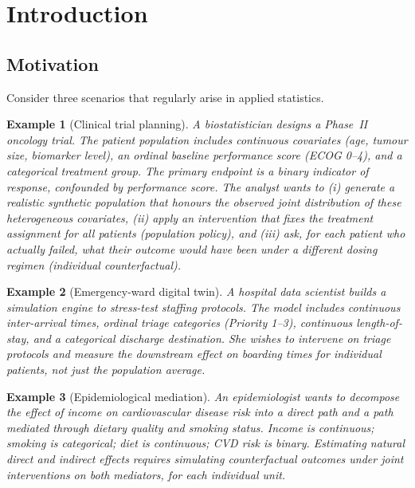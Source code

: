 \documentclass[12pt,a4paper]{article}
\newtheorem{example}{Example}[section]
\begin{document}
\tableofcontents
\newpage

\section{Introduction}
\label{sec:intro}

\subsection{Motivation}

Consider three scenarios that regularly arise in applied statistics.

\begin{example}[Clinical trial planning]
A biostatistician designs a Phase~II oncology trial. The patient population includes
continuous covariates (age, tumour size, biomarker level), an ordinal baseline
performance score (ECOG 0--4), and a categorical treatment group. The primary
endpoint is a binary indicator of response, confounded by performance score. The
analyst wants to (i) generate a realistic synthetic population that honours the
observed joint distribution of these heterogeneous covariates, (ii) apply an
intervention that fixes the treatment assignment for all patients (\emph{population
policy}), and (iii) ask, for each patient who actually failed, what their outcome
\emph{would have been} under a different dosing regimen (\emph{individual
counterfactual}).
\end{example}

\begin{example}[Emergency-ward digital twin]
A hospital data scientist builds a simulation engine to stress-test staffing
protocols. The model includes continuous inter-arrival times, ordinal triage
categories (Priority 1--3), continuous length-of-stay, and a categorical discharge
destination. She wishes to intervene on triage protocols and measure the
downstream effect on boarding times for individual patients, not just the
population average.
\end{example}

\begin{example}[Epidemiological mediation]
An epidemiologist wants to decompose the effect of income on cardiovascular
disease risk into a direct path and a path mediated through dietary quality and
smoking status. Income is continuous; smoking is categorical; diet is continuous;
CVD risk is binary. Estimating natural direct and indirect effects requires
simulating counterfactual outcomes under joint interventions on both mediators,
for each individual unit.
\end{example}
\end{document}
